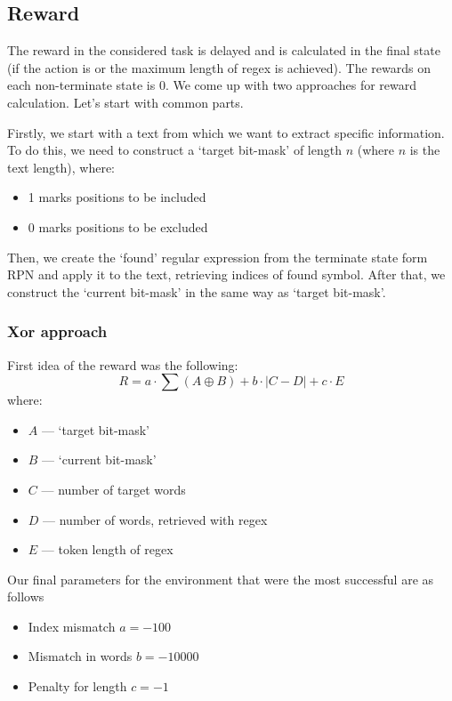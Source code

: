 \documentclass{article}
\begin{document}
\subsection{Reward}
The reward in the considered task is delayed and is calculated in the final state (if the action is  or the maximum length of regex is achieved). The rewards on each non-terminate state is 0.
We come up with two approaches for reward calculation.
Let's start with common parts.

Firstly, we start with a text from which we want to extract specific information. To do this, we need to construct a `target bit-mask' of length $n$ (where $n$ is the text length), where:
\begin{itemize}
  \item 1 marks positions to be included
  \item 0 marks positions to be excluded
\end{itemize}

Then, we create the `found' regular expression from the terminate state form RPN and apply it to the text, retrieving indices of found symbol.
After that, we construct the `current bit-mask' in the same way as `target bit-mask'.


\subsubsection{Xor approach}
First idea of the reward was the following:
\begin{equation}
  R = a \cdot \sum(A \oplus B) + b \cdot |C - D| + c \cdot E
\end{equation}
where:
\begin{itemize}
  \item $A$ --- `target bit-mask'
  \item $B$ --- `current bit-mask'
  \item $C$ --- number of target words
  \item $D$ --- number of words, retrieved with regex
  \item $E$ --- token length of regex
\end{itemize}

Our final parameters for the environment that were the most successful are as follows
\begin{itemize}
  \item Index mismatch $a = -100$
  \item Mismatch in words $b = -10000$
  \item Penalty for length $c = -1$
\end{itemize}
\end{document}

